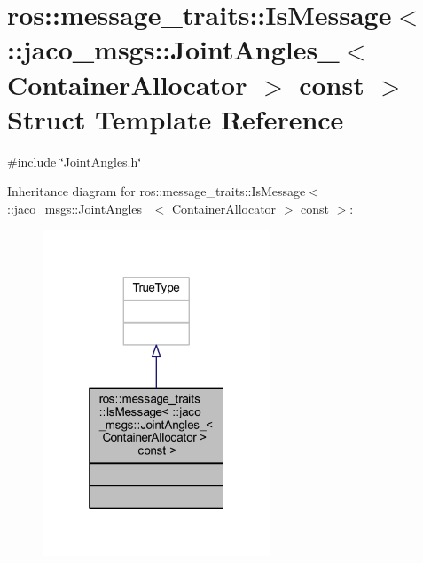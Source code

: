 \hypertarget{structros_1_1message__traits_1_1IsMessage_3_01_1_1jaco__msgs_1_1JointAngles___3_01ContainerAllocator_01_4_01const_01_01_4}{}\section{ros\+:\+:message\+\_\+traits\+:\+:Is\+Message$<$ \+:\+:jaco\+\_\+msgs\+:\+:Joint\+Angles\+\_\+$<$ Container\+Allocator $>$ const $>$ Struct Template Reference}
\label{structros_1_1message__traits_1_1IsMessage_3_01_1_1jaco__msgs_1_1JointAngles___3_01ContainerAllocator_01_4_01const_01_01_4}


{\ttfamily \#include \char`\"{}Joint\+Angles.\+h\char`\"{}}



Inheritance diagram for ros\+:\+:message\+\_\+traits\+:\+:Is\+Message$<$ \+:\+:jaco\+\_\+msgs\+:\+:Joint\+Angles\+\_\+$<$ Container\+Allocator $>$ const $>$\+:
\nopagebreak
\begin{figure}[H]
\begin{center}
\leavevmode
\includegraphics[width=193pt]{de/d0d/structros_1_1message__traits_1_1IsMessage_3_01_1_1jaco__msgs_1_1JointAngles___3_01ContainerAlloc162c87fb3b77034075477f7f1296ad06}
\end{center}
\end{figure}


